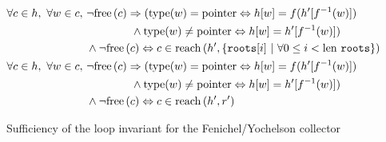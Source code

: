 \begin{figure}[t]
  \centering
  \begin{align*}
    \forall c \in h,\ \forall w \in c,\ &\lnot\free{c} \implies
    (\mathrm{type}(w) = \mathrm{pointer} \iff h[w] = f(h'[f^{-1}(w)])\\
    &\quad\quad\quad\quad \land \mathrm{type}(w) \neq \mathrm{pointer}
    \iff h[w] = h'[f^{-1}(w)])\\
    &\land \lnot\free{c} \iff c \in \reach{h'}{\{\mathtt{roots}[i]~|~\forall
      0 \leq i < \len\mathtt{roots}\}}\\
%
    \forall c \in h,\ \forall w \in c,\ &\lnot\free{c} \implies
    (\mathrm{type}(w) = \mathrm{pointer} \iff h[w] = f(h'[f^{-1}(w)])\\
    &\quad\quad\quad\quad \land \mathrm{type}(w) \neq \mathrm{pointer}
    \iff h[w] = h'[f^{-1}(w)])\\
    &\land \lnot\free{c} \iff c \in \reach{h'}{r'}
  \end{align*}
  \caption{Sufficiency of the loop invariant for the
    Fenichel/Yochelson collector}
  \label{fig:copying-example-partial-sufficient}
\end{figure}

